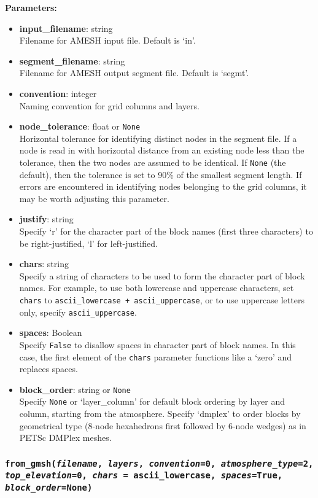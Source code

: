 \textbf{Parameters:}
\begin{itemize}
\item \textbf{input\_filename}: string\\
  Filename for AMESH input file. Default is `in'.
\item \textbf{segment\_filename}: string\\
  Filename for AMESH output segment file. Default is `segmt'.
\item \textbf{convention}: integer\\
  Naming convention for grid columns and layers.
\item \textbf{node\_tolerance}: float or \texttt{None}\\
  Horizontal tolerance for identifying distinct nodes in the segment file. If a node is read in with horizontal distance from an existing node less than the tolerance, then the two nodes are assumed to be identical. If \texttt{None} (the default), then the tolerance is set to 90\% of the smallest segment length. If errors are encountered in identifying nodes belonging to the grid columns, it may be worth adjusting this parameter.
\item \textbf{justify}: string\\
  Specify `r' for the character part of the block names (first three characters) to be right-justified, `l' for left-justified.
\item \textbf{chars}: string\\
  Specify a string of characters to be used to form the character part of block names.  For example, to use both lowercase and uppercase characters, set \texttt{chars} to \texttt{ascii\_lowercase + ascii\_uppercase}, or to use uppercase letters only, specify \texttt{ascii\_uppercase}.
\item \textbf{spaces}: Boolean\\
  Specify \texttt{False} to disallow spaces in character part of block names. In this case, the first element of the \texttt{chars} parameter functions like a `zero' and replaces spaces.
\item \textbf{block\_order}: string or \texttt{None}\\
  Specify \texttt{None} or `layer\_column' for default block ordering by layer and column, starting from the atmosphere. Specify `dmplex' to order blocks by geometrical type (8-node hexahedrons first followed by 6-node wedges) as in PETSc DMPlex meshes.
\end{itemize}

\begin{snugshade}\subsubsection{\texttt{from\_gmsh(\emph{filename}, \emph{layers}, \emph{convention}=0, \emph{atmosphere\_type}=2,\\
      \emph{top\_elevation}=0, \emph{chars} = ascii\_lowercase, \emph{spaces}=\texttt{True},\\
      \emph{block\_order}=None)}}\end{snugshade}
\label{sec:mulgrid:from_gmsh}

